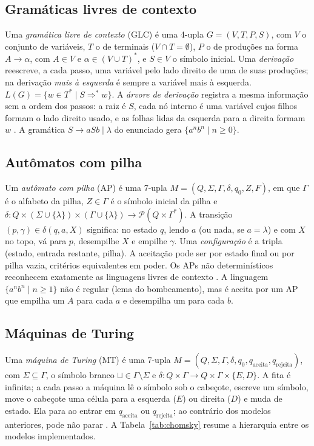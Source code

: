 \documentclass[12pt,a4paper]{article}
\newcommand{\lam}{\lambda}
\begin{document}
\subsection{Gramáticas livres de contexto}

Uma \emph{gramática livre de contexto} (GLC) é uma 4-upla $G = (V, T, P, S)$,
com $V$ o conjunto de variáveis, $T$ o de terminais ($V \cap T = \emptyset$),
$P$ o de produções na forma $A \to \alpha$, com $A \in V$ e
$\alpha \in (V \cup T)^*$, e $S \in V$ o símbolo inicial. Uma \emph{derivação}
reescreve, a cada passo, uma variável pelo lado direito de uma de suas
produções; na derivação \emph{mais à esquerda} é sempre a variável mais à
esquerda. $L(G) = \{ w \in T^* \mid S \Rightarrow^* w \}$. A \emph{árvore de
derivação} registra a mesma informação sem a ordem dos passos: a raiz é $S$,
cada nó interno é uma variável cujos filhos formam o lado direito usado, e as
folhas lidas da esquerda para a direita formam $w$ \cite{sipser}. A gramática
$S \to aSb \mid \lam$ do enunciado gera $\{a^nb^n \mid n \ge 0\}$.

\subsection{Autômatos com pilha}

Um \emph{autômato com pilha} (AP) é uma 7-upla
$M = (Q, \Sigma, \Gamma, \delta, q_0, Z, F)$, em que $\Gamma$ é o alfabeto da
pilha, $Z \in \Gamma$ é o símbolo inicial da pilha e
$\delta: Q \times (\Sigma \cup \{\lam\}) \times (\Gamma \cup \{\lam\}) \to
\mathcal{P}(Q \times \Gamma^*)$. A transição
$(p, \gamma) \in \delta(q, a, X)$ significa: no estado $q$, lendo $a$ (ou nada,
se $a = \lam$) e com $X$ no topo, vá para $p$, desempilhe $X$ e empilhe
$\gamma$. Uma \emph{configuração} é a tripla (estado, entrada restante, pilha).
A aceitação pode ser por estado final ou por pilha vazia, critérios
equivalentes em poder. Os APs não determinísticos reconhecem exatamente as
linguagens livres de contexto \cite{hopcroft}. A linguagem
$\{a^nb^n \mid n \ge 1\}$ não é regular (lema do bombeamento), mas é aceita
por um AP que empilha um $A$ para cada $a$ e desempilha um para cada $b$.

\subsection{Máquinas de Turing}

Uma \emph{máquina de Turing} (MT) é uma 7-upla
$M = (Q, \Sigma, \Gamma, \delta, q_0, q_{\text{aceita}}, q_{\text{rejeita}})$,
com $\Sigma \subseteq \Gamma$, o símbolo branco $\sqcup \in \Gamma \setminus \Sigma$
e $\delta: Q \times \Gamma \to Q \times \Gamma \times \{E, D\}$. A fita é infinita;
a cada passo a máquina lê o símbolo sob o cabeçote, escreve um símbolo, move o
cabeçote uma célula para a esquerda ($E$) ou direita ($D$) e muda de estado.
Ela para ao entrar em $q_{\text{aceita}}$ ou $q_{\text{rejeita}}$; ao contrário
dos modelos anteriores, pode não parar \cite{sipser}. A
Tabela~\ref{tab:chomsky} resume a hierarquia entre os modelos implementados.
\end{document}
